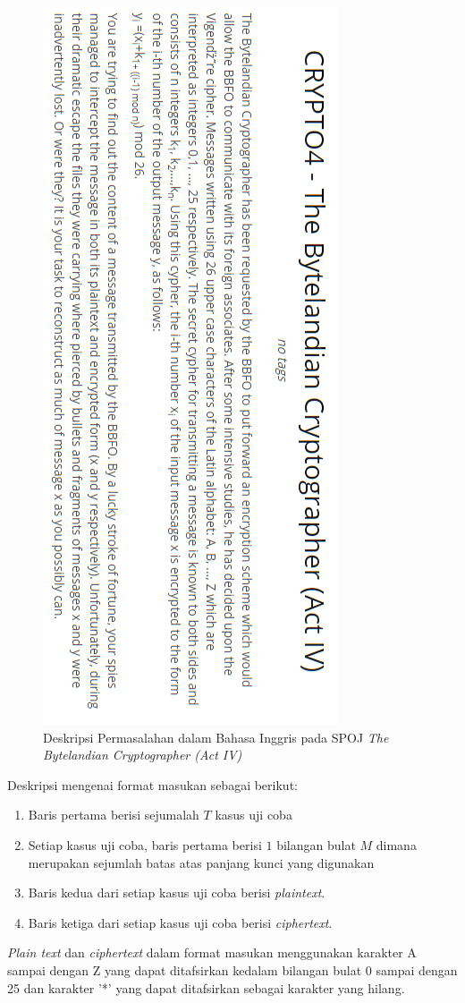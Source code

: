 	\begin{figure}[H]
		\centering
		\includegraphics[scale=0.75]{images/bab2/crypto_def.png}
		\caption{Deskripsi Permasalahan dalam Bahasa Inggris pada SPOJ \textit{The Bytelandian Cryptographer (Act IV)}}
		\label{fig:crypto4_def}
	\end{figure}
	
	Deskripsi mengenai format masukan sebagai berikut:
	\begin{enumerate}
	\item Baris pertama berisi sejumalah $T$ kasus uji coba
	\item Setiap kasus uji coba, baris pertama berisi $1$ bilangan bulat $M$ dimana merupakan sejumlah batas atas panjang kunci yang digunakan 
	\item Baris kedua dari setiap kasus uji coba berisi \textit{plaintext}.
	\item Baris ketiga dari setiap kasus uji coba berisi \textit{ciphertext}.
	\end{enumerate}
	\textit{Plain text} dan \textit{ciphertext} dalam format masukan menggunakan karakter A sampai dengan Z yang dapat ditafsirkan kedalam bilangan bulat 0 sampai dengan 25 dan karakter '*' yang dapat ditafsirkan sebagai karakter yang hilang.
	
